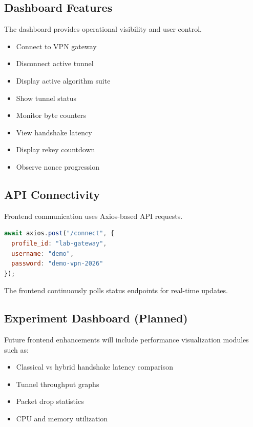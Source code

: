 \subsection{Dashboard Features}
\label{subsec:dashboard_features}

The dashboard provides operational visibility and user control.

\begin{itemize}
    \item Connect to VPN gateway
    \item Disconnect active tunnel
    \item Display active algorithm suite
    \item Show tunnel status
    \item Monitor byte counters
    \item View handshake latency
    \item Display rekey countdown
    \item Observe nonce progression
\end{itemize}



\subsection{API Connectivity}
\label{subsec:frontend_connectivity}

Frontend communication uses Axios-based API requests.

\begin{lstlisting}[language=JavaScript, caption={Connect API Request}]
await axios.post("/connect", {
  profile_id: "lab-gateway",
  username: "demo",
  password: "demo-vpn-2026"
});
\end{lstlisting}

The frontend continuously polls status endpoints for real-time updates.

\subsection{Experiment Dashboard (Planned)}
\label{subsec:experiment_dashboard}

Future frontend enhancements will include performance visualization modules such as:

\begin{itemize}
    \item Classical vs hybrid handshake latency comparison
    \item Tunnel throughput graphs
    \item Packet drop statistics
    \item CPU and memory utilization
\end{itemize}

